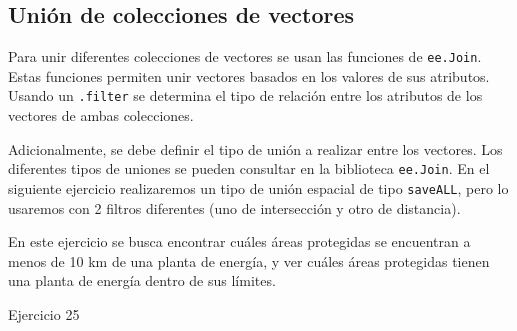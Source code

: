 \documentclass[
  12pt,
  letterpaper,
  twoside]{book}
\begin{document}
\hypertarget{uniuxf3n-de-colecciones-de-vectores}{%
\subsection{Unión de colecciones de vectores}\label{uniuxf3n-de-colecciones-de-vectores}}

Para unir diferentes colecciones de vectores se usan las funciones de \texttt{ee.Join}. Estas funciones permiten unir vectores basados en los valores de sus atributos. Usando un \texttt{.filter} se determina el tipo de relación entre los atributos de los vectores de ambas colecciones.

Adicionalmente, se debe definir el tipo de unión a realizar entre los vectores. Los diferentes tipos de uniones se pueden consultar en la biblioteca \texttt{ee.Join}. En el siguiente ejercicio realizaremos un tipo de unión espacial de tipo \texttt{saveALL}, pero lo usaremos con 2 filtros diferentes (uno de intersección y otro de distancia).

En este ejercicio se busca encontrar cuáles áreas protegidas se encuentran a menos de 10 km de una planta de energía, y ver cuáles áreas protegidas tienen una planta de energía dentro de sus límites.

Ejercicio 25
\end{document}
